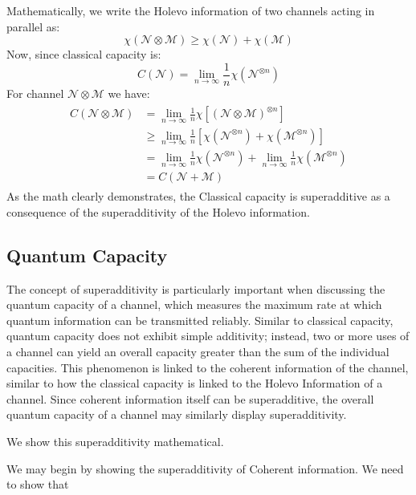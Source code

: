Mathematically, we write the Holevo information of two channels acting in parallel as:
\begin{equation}
    \chi(\mathcal{N} \otimes \mathcal{M}) \geq \chi(\mathcal{N}) + \chi(\mathcal{M})
\end{equation}
Now, since classical capacity is:
\begin{equation}
    C(\mathcal{N}) = \lim_{n \rightarrow \infty }\frac{1}{n}\chi(\mathcal{N}^{\otimes n})
\end{equation}
For channel $\mathcal{N}\otimes\mathcal{M}$ we have:
\begin{align}\begin{split}
    C(\mathcal{N}\otimes\mathcal{M}) & = \lim_{n \rightarrow \infty }\frac{1}{n}\chi[(\mathcal{N}\otimes\mathcal{M})^{\otimes n}]\\
    & \geq \lim_{n \rightarrow \infty }\frac{1}{n}[\chi(\mathcal{N}^{\otimes n}) + \chi(\mathcal{M}^{\otimes n})]\\
    & = \lim_{n \rightarrow \infty }\frac{1}{n}\chi(\mathcal{N}^{\otimes n}) + \lim_{n \rightarrow \infty }\frac{1}{n}\chi(\mathcal{M}^{\otimes n})\\
    & = C(\mathcal{N} + \mathcal{M})
\end{split}\end{align}
As the math clearly demonstrates, the Classical capacity is superadditive as a consequence
of the superadditivity of the Holevo information.

\subsection{Quantum Capacity}
The concept of superadditivity is particularly important when discussing the quantum capacity
of a channel, which measures the maximum rate at which quantum information can be transmitted
reliably. Similar to classical capacity, quantum capacity does not exhibit simple additivity;
instead, two or more uses of a channel can yield an overall capacity greater than the sum of
the individual capacities. This phenomenon is linked to the coherent information of the
channel, similar to how the classical capacity is linked to the Holevo Information of a channel.
Since coherent information itself can be superadditive, the overall quantum capacity of a
channel may similarly display superadditivity.

We show this superadditivity mathematical.

We may begin by showing the superadditivity of Coherent information. We need to show that
    
